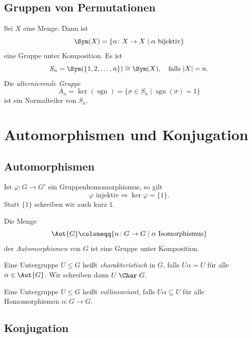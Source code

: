 \documentclass[11pt]{article}
\begin{document}
\subsection{Gruppen von Permutationen}

\begin{example}
  Sei $X$ eine Menge. Dann ist
  \[ \Sym(X) = \{ \alpha\colon X \to X \mid \alpha \text{ bijektiv} \} \]
  eine Gruppe unter Komposition. Es ist
  \[ S_n = \Sym(\{1, 2, \dots, n\}) \cong \Sym(X), \quad \text{falls } \lvert X \rvert = n. \]
  Die \emph{alternierende Gruppe}
  \[ A_n = \ker(\operatorname{sgn}) = \{ \sigma \in S_n \mid \operatorname{sgn}(\sigma) = 1 \} \]
  ist ein Normalteiler von $S_n$.
\end{example}

\section{Automorphismen und Konjugation}

\subsection{Automorphismen}

\begin{note}
  Ist $\varphi\colon G \to G'$ ein Gruppenhomomorphismus, so gilt
  \[ \varphi \text{ injektiv} \iff \ker\varphi = \{1\}. \]
  Statt $\{1\}$ schreiben wir auch kurz $1$.
\end{note}

\begin{definition}[Automorphismengruppe]\Theorem
  Die Menge
  \[ \Aut{G} \coloneqq \{\alpha\colon G \to G \mid \alpha \text{ Isomorphismus}\} \]
  der \emph{Automorphismen} von $G$ ist eine Gruppe unter Komposition.
\end{definition}

\begin{definition}\Theorem
  Eine Untergruppe $U \le G$ heißt \emph{charakteristisch} in $G$, falls $U\alpha = U$ für alle $\alpha \in \Aut{G}$. Wir schreiben dann $U \mathrel{\Char} G$.

  Eine Untergruppe $U \le G$ heißt \emph{vollinvariant}, falls $U\alpha \subseteq U$ für alle Homomorphismen $\alpha\colon G \to G$.
\end{definition}


\subsection{Konjugation}
\end{document}
